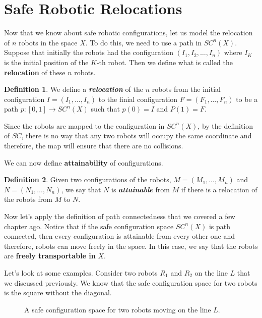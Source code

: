 \documentclass{article}
\theoremstyle{definition}
\newtheorem*{definition}{Definition}
\begin{document}
\section*{\centering Safe Robotic Relocations}
Now that we know about safe robotic configurations, let us model the relocation
of $n$ robots in the space $X$. To do this, we need to use a path in $SC^n(X)$.
Suppose that initially the robots had the configuration $(I_1, I_2, \dots, I_n)$
where $I_K$ is the initial position of the $K$-th robot. Then we define what is
called the \textbf{relocation} of these $n$ robots.

\begin{definition}
\cite{11} We define a \textit{\textbf{relocation}} of the $n$ robots from the initial configuration
$I = (I_1, \dots, I_n)$ to the finial configuration $F = (F_1, \dots, F_n)$ to be a path
$p : [0, 1] \to SC^n(X)$ such that $p(0) = I$ and $P(1) = F$.
\end{definition}

Since the robots are mapped to the configuration in $SC^n(X)$, by the definition of $SC$,
there is no way that any two robots will occupy the same coordinate and therefore, the map
will ensure that there are no collisions.

\bigskip

We can now define \textbf{attainability} of configurations.

\begin{definition}
\cite{12} Given two configurations of the robots, $M = (M_1, \dots, M_n)$ and $N = (N_1, \dots, N_n)$,
we say that $N$ is \textit{\textbf{attainable}} from $M$ if there is a relocation of the robots
from $M$ to $N$.
\end{definition}

Now let's apply the definition of path connectedness that we covered a few chapter ago.
Notice that if the safe configuration space $SC^n(X)$ is path connected, then every configuration
is attainable from every other one and therefore, robots can move freely in the space.
In this case, we say that the robots are \textbf{freely transportable in} $X$.

\bigskip

Let's look at some examples. Consider two robots $R_1$ and $R_2$ on the line $L$ that we discussed previously.
We know that the safe configuration space for two robots is the square without the diagonal.

\begin{figure}[H]
    \centering
    \caption*{A safe configuration space for two robots moving on the line $L$.}
\end{figure}
\end{document}
